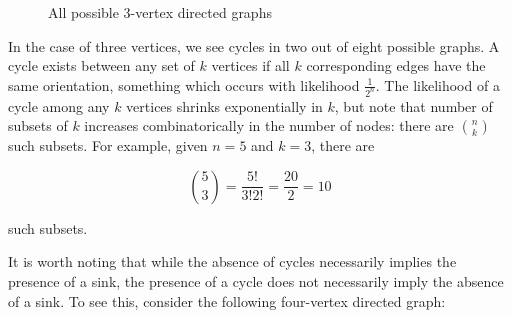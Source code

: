 \documentclass[12pt]{book}
\begin{document}
\begin{figure}[hbt]
\begin{center}
\quad
{}
\end{center}

\caption{All possible 3-vertex directed graphs}
\end{figure}

In the case of three vertices, we see cycles in two out of eight possible graphs.
A cycle exists between any set of $k$ vertices if all $k$ corresponding edges have the same orientation, something which occurs with likelihood $\frac{1}{2^n}$.
The likelihood of a cycle among any $k$ vertices shrinks exponentially in $k$, but note that number of subsets of $k$ increases combinatorically in the number of nodes: there are ${n}\choose{k}$ such subsets.
For example, given $n = 5$ and $k = 3$, there are

\[
{{5}\choose{3}} = \frac{5!}{3! 2!} = \frac{20}{2} = 10
\]

such subsets.

It is worth noting that while the absence of cycles necessarily implies the presence of a sink, the presence of a cycle does not necessarily imply the absence of a sink.
To see this, consider the following four-vertex directed graph:

\begin{center}
\end{center}
\end{document}
